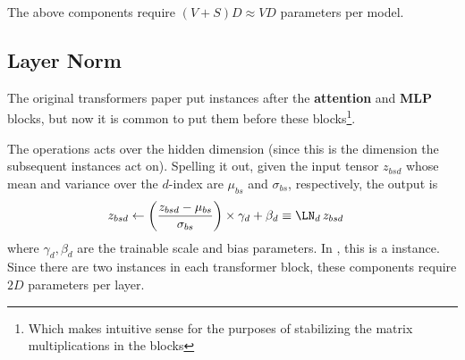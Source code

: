 \documentclass[11pt]{article}
\begin{document}
The above components require $ (V+S)D \approx VD $ parameters per model.



\subsection{Layer Norm \label{subsubsec_layer_norm} }

The original transformers paper \cite{vaswani2017attention} put  instances after
the \textbf{attention} and \textbf{MLP} blocks, but now it is common \cite{xiong2020layer} to put
them before these blocks\footnote{Which makes intuitive sense for the purposes of stabilizing the
	matrix multiplications in the blocks}.

The  operations acts over the hidden dimension (since this is the dimension the
subsequent  instances act on). Spelling it out, given the input tensor $ z _{ bsd }
$ whose mean and variance over the $ d $-index are $ \mu _{ bs } $ and $ \sigma _{ bs } $,
respectively, the  output is
\begin{align}
	z _{ bsd } & \leftarrow \left ( \frac{ z _{ bsd } - \mu _{ bs } }{ \sigma _{ bs } } \right )\times \gamma _{ d }
	+ \beta _{ d } \equiv \LN_{ d }\, z _{ bsd}
\end{align}
where $ \gamma _{ d }, \beta  _{ d } $ are the trainable scale and bias parameters. In
, this is a  instance.
Since there are two  instances in each transformer block, these components require
$ 2D $ parameters per layer.
\end{document}
